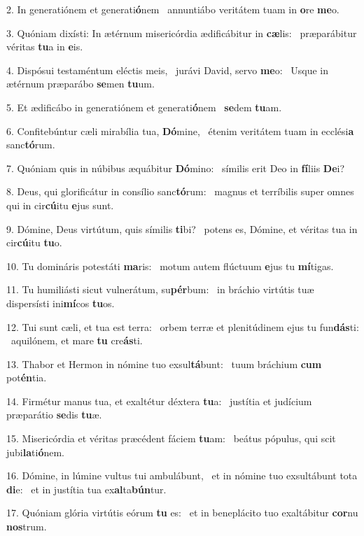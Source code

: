 2. In generatiónem et generati\textbf{ó}nem \ast\  annuntiábo veritátem tuam in \textbf{o}re \textbf{me}o.\

3. Quóniam dixísti: In ætérnum misericórdia ædificábitur in \textbf{cæ}lis: \ast\  præparábitur véritas \textbf{tu}a in \textbf{e}is.\

4. Dispósui testaméntum eléctis meis, \dag\  jurávi David, servo \textbf{me}o: \ast\  Usque in ætérnum præparábo \textbf{se}men \textbf{tu}um.\

5. Et ædificábo in generatiónem et generati\textbf{ó}nem \ast\  \textbf{se}dem \textbf{tu}am.\

6. Confitebúntur cæli mirabília tua, \textbf{Dó}mine, \ast\  étenim veritátem tuam in ecclési\textbf{a} sanc\textbf{tó}rum.\

7. Quóniam quis in núbibus æquábitur \textbf{Dó}mino: \ast\  símilis erit Deo in \textbf{fí}liis \textbf{De}i?\

8. Deus, qui glorificátur in consílio sanc\textbf{tó}rum: \ast\  magnus et terríbilis super omnes qui in cir\textbf{cú}itu \textbf{e}jus sunt.\

9. Dómine, Deus virtútum, quis símilis \textbf{ti}bi? \ast\  potens es, Dómine, et véritas tua in cir\textbf{cú}itu \textbf{tu}o.\

10. Tu domináris potestáti \textbf{ma}ris: \ast\  motum autem flúctuum \textbf{e}jus tu \textbf{mí}tigas.\

11. Tu humiliásti sicut vulnerátum, su\textbf{pér}bum: \ast\  in bráchio virtútis tuæ dispersísti ini\textbf{mí}cos \textbf{tu}os.\

12. Tui sunt cæli, et tua est terra: \dag\  orbem terræ et plenitúdinem ejus tu fun\textbf{dás}ti: \ast\  aquilónem, et mare \textbf{tu} cre\textbf{ás}ti.\

13. Thabor et Hermon in nómine tuo exsul\textbf{tá}bunt: \ast\  tuum bráchium \textbf{cum} pot\textbf{én}tia.\

14. Firmétur manus tua, et exaltétur déxtera \textbf{tu}a: \ast\  justítia et judícium præparátio \textbf{se}dis \textbf{tu}æ.\

15. Misericórdia et véritas præcédent fáciem \textbf{tu}am: \ast\  beátus pópulus, qui scit jubi\textbf{la}ti\textbf{ó}nem.\

16. Dómine, in lúmine vultus tui ambulábunt, \dag\  et in nómine tuo exsultábunt tota \textbf{di}e: \ast\  et in justítia tua ex\textbf{al}ta\textbf{bún}tur.\

17. Quóniam glória virtútis eórum \textbf{tu} es: \ast\  et in beneplácito tuo exaltábitur \textbf{cor}nu \textbf{nos}trum.\

